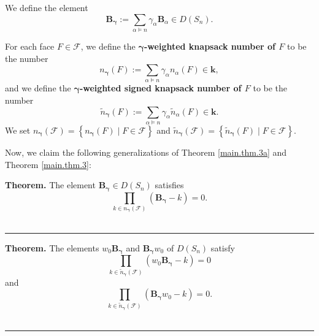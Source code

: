 \documentclass[12pt]{article}
\theoremstyle{definition}%
\newtheorem{thm}{Theorem}[section]
\theoremstyle{definition}%
\theoremstyle{remark}%
\newcommand{\tup}[1]{\left( #1 \right)}
\newcommand{\set}[1]{\left\{ #1 \right\}}
\newcommand{\kk}{\mathbf{k}}
\newcommand{\dsn}{D\left(S_n\right)}
\newcommand{\BB}{\mathbf{B}}
\newcommand{\BBa}{\mathbf{B}_{\alpha}}
\newcommand{\CF}{\mathcal{F}}
\newcommand{\bgamma}{\bm{\gamma}}
\newcommand{\wo}{w_0} %
\newcommand{\nn}{\widetilde{n}}%
\newcommand{\defin}[1]{\textbf{#1}}
\newenvironment{thm}[1][Theorem]{\noindent\textbf{#1.} }{\ \rule{0.5em}{0.5em}}
\begin{document}
We define the element
\[
\BB_{\bgamma} := \sum_{\alpha \models n} \gamma_\alpha \BBa \in \dsn.
\]

For each face $F \in \CF$, we define the \defin{$\bgamma$-weighted knapsack number of $F$} to be the number
\[
n_{\bgamma}\tup{F} := \sum_{\alpha \models n} \gamma_\alpha n_\alpha\tup{F} \in \kk,
\]
and we define the \defin{$\bgamma$-weighted signed knapsack number of $F$} to be the number
\[
\nn_{\bgamma}\tup{F} := \sum_{\alpha \models n} \gamma_\alpha \nn_\alpha\tup{F} \in \kk.
\]
We set $n_{\bgamma}\tup{\CF} = \set{n_{\bgamma}\tup{F} \mid F \in \CF}$
and $\nn_{\bgamma}\tup{\CF} = \set{\nn_{\bgamma}\tup{F} \mid F \in \CF}$.

Now, we claim the following generalizations of Theorem \ref{main.thm.3a} and Theorem \ref{main.thm.3}:

\begin{thm}
\label{thm.gen.3a}
The element $\BB_{\bgamma} \in \dsn$ satisfies
\begin{equation}
\prod_{k\in n_{\bgamma}\tup{\CF}} \tup{\BB_{\bgamma} - k}
=0.
\label{eq.gen.3a}
\end{equation}
\end{thm}

\begin{thm}
\label{thm.gen.3}
The elements $\wo \BB_{\bgamma}$ and $\BB_{\bgamma} \wo$ of $\dsn$ satisfy
\begin{equation}
\prod_{k \in \nn_{\bgamma}\tup{\CF}} \tup{\wo\BB_{\bgamma} - k}
=0
\label{eq.gen.2a}
\end{equation}
and
\begin{equation}
\prod_{k \in \nn_{\bgamma}\tup{\CF}} \tup{\BB_{\bgamma}\wo - k}
=0.
\label{eq.gen.2b}
\end{equation}
\end{thm}
\end{document}
